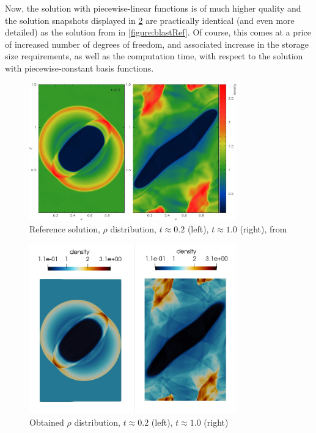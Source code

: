 Now, the solution with piecewise-linear functions is of much higher quality and the solution snapshots displayed in \cref{figure:blastFinal} are practically identical (and even more detailed) as the solution from \cite{blastNew1} in \cref{figure:blastRef}. Of course, this comes at a price of increased number of degrees of freedom, and associated increase in the storage size requirements, as well as the computation time, with respect to the solution with piecewise-constant basis functions.

\begin{figure}[H]
	\begin{center}
		\includegraphics[width=0.8\textwidth]{img/mhd-blast/new/ref.jpg}
	\caption{Reference solution, $\rho$ distribution, $t \approx 0.2$ (left), $t \approx 1.0$ (right), from \cite{blastNew1}}
	\label{figure:blastFinal}
	\end{center}
\end{figure}
\vspace{-6mm}
\begin{figure}[H]
	\begin{center}
		\includegraphics[width=0.8\textwidth]{img/mhd-blast/new/ref-result.jpg}
	\caption{Obtained $\rho$ distribution, $t \approx 0.2$ (left), $t \approx 1.0$ (right)}
	\label{figure:blastFinal}
	\end{center}
\end{figure}
\vspace{-4mm}

